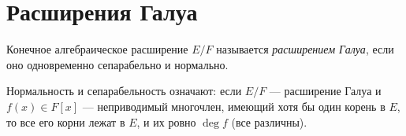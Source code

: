 \section{Расширения Галуа}

\begin{definition}
    Конечное алгебраическое расширение $E/F$ называется \emph{расширением Галуа}, если оно одновременно сепарабельно и нормально.

\end{definition}

\begin{remark}
    Нормальность и сепарабельность означают: если $E/F$ --- расширение Галуа и $f(x) \in F[x]$ --- неприводимый многочлен,
    имеющий хотя бы один корень в $E$, то все его корни лежат в $E$, и их ровно $\deg f$ (все различны).
\end{remark}
